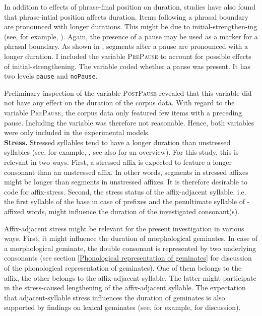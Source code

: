 In addition to effects of phrase-final position on duration, studies have also found that phrase-intial position affects duration. Items following a phrasal boundary are pronounced with longer durations. This might be due to initial-strengthen-ing (see, for example, \citealt{Cho.2001b,Byrd.2006,Cho.2007}). Again, the presence of a pause may be used as a marker for a phrasal boundary. As shown in \cite{Umeda.1977}, segments after a pause are pronounced with a longer duration. 
I included the variable \textsc{PrePause} to account for possible effects of initial-strengthening. The variable coded whether a pause was present. It has two levels \texttt{pause} and \texttt{noPause}. 

Preliminary inspection of the variable \textsc{PostPause} revealed that this variable did not have any effect on the duration of the corpus data. With regard to the variable \textsc{PrePause}, the corpus data only featured few items with a preceding pause.  Including the variable was therefore not reasonable. Hence, both variables were only included in the experimental models. \\

\textbf{Stress.} \label{stress coding} Stressed syllables tend to have a longer duration than unstressed syllables (see, for example, \citealt{Fry.1955, Fry.1958, Lieberman.1960, Beckman.1986, Eriksson.2016}, see also \citealt{Laver.1994} for an overview). For this study, this is relevant in two ways.  First, a stressed affix is expected to feature a longer consonant than an unstressed affix. In other words, segments in stressed affixes might be longer than segments in unstressed affixes. It is therefore desirable to code for affix-stress.
Second, the stress status of the affix-adjacent syllable, i.e. the first syllable of the base in case of prefixes and the penultimate syllable of -affixed words, might influence the duration of the investigated consonant(s). 

Affix-adjacent stress might be relevant  for the present investigation in various ways. First, it might influence the duration of morphological geminates. In case of a morphological geminate, the double consonant is represented by two underlying consonants (see section \ref{Phonological representation of geminates} for discussion of the phonological representation of geminates). One of them belongs to the affix, the other belongs to the affix-adjacent syllable. The latter might participate in the stress-caused lengthening of the affix-adjacent syllable.  The expectation that adjacent-syllable stress influences the duration of geminates is also supported by findings on lexical geminates (see, for example, \citealt{Dmitrieva.2017} for discussion).


